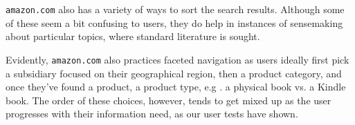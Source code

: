 \begin{enumerate}[a.]
\texttt{amazon.com} also has a variety of ways to sort the search
results\cite[\textsection\ 8.3]{hearst}. Although some of these seem a bit
confusing to users, they do help in instances of sensemaking about particular
topics, where standard literature is sought.

Evidently, \texttt{amazon.com} also practices faceted navigation
\cite[\textsection\ 8.6]{hearst} as users ideally first pick a subsidiary
focused on their geographical region, then a product category, and once they've
found a product, a product type, e.g . a physical book vs. a Kindle book. The
order of these choices, however, tends to get mixed up as the user progresses
with their information need, as our user tests have shown.

\end{enumerate}
